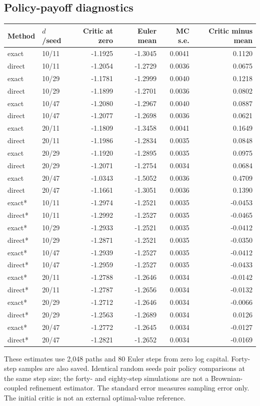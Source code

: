 \subsection{Policy-payoff diagnostics}
\begingroup\footnotesize\setlength{\tabcolsep}{4pt}
\begin{longtable}{llrrrr}
\toprule Method & $d$/seed & Critic at zero & Euler mean & MC s.e. & Critic minus mean\\\midrule\endhead
exact & 10/11 & -1.1925 & -1.3045 & 0.0041 & 0.1120\\
direct & 10/11 & -1.2054 & -1.2729 & 0.0036 & 0.0675\\
exact & 10/29 & -1.1781 & -1.2999 & 0.0040 & 0.1218\\
direct & 10/29 & -1.1899 & -1.2701 & 0.0036 & 0.0802\\
exact & 10/47 & -1.2080 & -1.2967 & 0.0040 & 0.0887\\
direct & 10/47 & -1.2077 & -1.2698 & 0.0036 & 0.0621\\
exact & 20/11 & -1.1809 & -1.3458 & 0.0041 & 0.1649\\
direct & 20/11 & -1.1986 & -1.2834 & 0.0035 & 0.0848\\
exact & 20/29 & -1.1920 & -1.2895 & 0.0035 & 0.0975\\
direct & 20/29 & -1.2071 & -1.2754 & 0.0034 & 0.0684\\
exact & 20/47 & -1.0343 & -1.5052 & 0.0036 & 0.4709\\
direct & 20/47 & -1.1661 & -1.3051 & 0.0036 & 0.1390\\
exact* & 10/11 & -1.2974 & -1.2521 & 0.0035 & -0.0453\\
direct* & 10/11 & -1.2992 & -1.2527 & 0.0035 & -0.0465\\
exact* & 10/29 & -1.2933 & -1.2521 & 0.0035 & -0.0412\\
direct* & 10/29 & -1.2871 & -1.2521 & 0.0035 & -0.0350\\
exact* & 10/47 & -1.2939 & -1.2527 & 0.0035 & -0.0412\\
direct* & 10/47 & -1.2959 & -1.2527 & 0.0035 & -0.0433\\
exact* & 20/11 & -1.2788 & -1.2646 & 0.0034 & -0.0142\\
direct* & 20/11 & -1.2787 & -1.2656 & 0.0034 & -0.0132\\
exact* & 20/29 & -1.2712 & -1.2646 & 0.0034 & -0.0066\\
direct* & 20/29 & -1.2563 & -1.2689 & 0.0034 & 0.0126\\
exact* & 20/47 & -1.2772 & -1.2645 & 0.0034 & -0.0127\\
direct* & 20/47 & -1.2821 & -1.2652 & 0.0034 & -0.0169\\
\bottomrule\end{longtable}\endgroup
These estimates use 2,048 paths and 80 Euler steps from zero log capital. Forty-step samples are also saved. Identical random seeds pair policy comparisons at the same step size; the forty- and eighty-step simulations are not a Brownian-coupled refinement estimator. The standard error measures sampling error only. The initial critic is not an external optimal-value reference.
